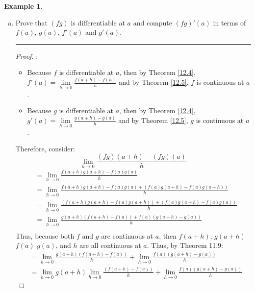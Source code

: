 \documentclass[openany, amssymb, psamsfonts]{amsart}
\theoremstyle{definition}
\newtheorem{exmp}{Example}[section]
\numberwithin{equation}{section}
\begin{document}
\begin{exmp}
\begin{enumerate}[(a)]
\begin{proof}
Thus, because both $f$ and $g$ are continuous at $a$, then $f(a+h)$, $g(a+h)$ $f(a)$ $g(a)$, and $h$ are all continuous at $a$. Thus, by Theorem 11.9:\[(f+g)'(a) = \lim\limits_{h\to 0 } \frac{f(a+h) - f(a)}{h} + \lim\limits_{h\to 0 }\frac{g(a+h) - g(a)}{h}\] Because both components on the right hand side exist and equal the derivatives, then $(f+g)'(a) = f'(a) + g'(a)$ exists.
  \end{proof}\vspace{4pt}     \hrule   \vspace{4pt}
		\item Prove that $(fg)$ is differentiable at $a$ and  compute $(fg)'(a)$ in terms of $f(a)$, $g(a)$, $f'(a)$ and $g'(a)$. 
\vspace{4pt}     \hrule   \vspace{4pt}  \begin{proof}:\\
\begin{itemize}
    \item Because $f$ is differentiable at $a$, then by Theorem \ref{12.4}, $f'(a) = \lim\limits_{h\to 0} \frac{f(a+h) - f(h)}{h}$ and by Theorem \ref{12.5}, $f$ is continuous at $a$. 
    \item Because $g$ is differentiable at $a$, then by Theorem \ref{12.4}, $g'(a) = \lim\limits_{h\to 0} \frac{g(a+h) - g(a)}{h}$ and by Theorem \ref{12.5}, $g$ is continuous at $a$.
\end{itemize} 
Therefore, consider:
\[\lim\limits_{h\to 0}\frac{(fg)(a+h) - (fg)(a)}{h}\]
  \begin{align*}
    &=\lim\limits_{h\to 0}\frac{f(a+h)g(a+h) - f(a)g(a)}{h}\\
    &=\lim\limits_{h\to 0}\frac{f(a+h)g(a+h) - f(a)g(a) + (f(a)g(a+h) - f(a)g(a+h))}{h}\\
    &=\lim\limits_{h\to 0}\frac{(f(a+h)g(a+h) - f(a)g(a+h)) + (f(a)g(a+h) - f(a)g(a))}{h}\\
    &=\lim\limits_{h\to 0}\frac{g(a+h)(f(a+h) -f(a)) + f(a)(g(a+h) - g(a))}{h}\\
  \end{align*}
Thus, because both $f$ and $g$ are continuous at $a$, then $f(a+h)$, $g(a+h)$ $f(a)$ $g(a)$, and $h$ are all continuous at $a$. Thus, by Theorem 11.9:
  \begin{align*}
    &=\lim\limits_{h\to 0}\frac{g(a+h)(f(a+h) -f(a))}{h} + \lim\limits_{h\to 0}\frac{f(a)(g(a+h) - g(a))}{h}\\
    &=\lim\limits_{h\to 0}g(a+h)\lim\limits_{h\to 0}\frac{(f(a+h) -f(a))}{h} + \lim\limits_{h\to 0}\frac{f(a)(g(a+h) - g(a))}{h}

\end{align*}
\end{proof}
\end{enumerate}
\end{exmp}
\end{document}
